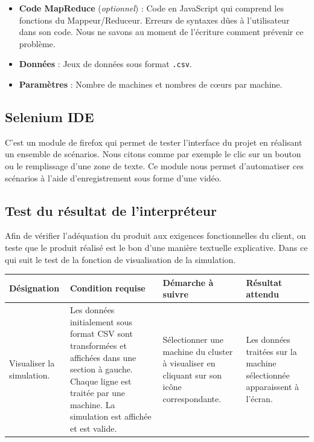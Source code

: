 \vspace{10pt}
\begin{itemize}
\item \textbf{Code MapReduce} (\emph{optionnel}) : Code en JavaScript qui comprend les fonctions du Mappeur/Reduceur. Erreurs de syntaxes dûes à l'utilisateur dans son code. Nous ne savons au moment de l'écriture comment prévenir ce problème.

\item \textbf{Données} : Jeux de données sous format \texttt{.csv}.

\item \textbf{Paramètres} : Nombre de machines et nombres de cœurs par machine.
\end{itemize}

\subsection*{Selenium IDE}
C'est un module de firefox qui permet de tester l'interface du projet en réalisant un ensemble de scénarios. Nous citons comme par exemple le clic sur un bouton ou le remplissage d'une zone de texte. Ce module nous permet d'automatiser ces scénarios à l'aide d'enregistrement sous forme d'une vidéo.

\subsection*{Test du résultat de l'interpréteur} 
Afin de vérifier l'adéquation du produit aux exigences fonctionnelles du client, on teste que le produit réalisé est le bon d'une manière textuelle explicative.
Dans ce qui suit le test de la fonction de visualisation de la simulation.
\vspace{11pt}

\begin{tabularx}{\textwidth}{|X|X|X|X|}
  \hline
  Désignation & Condition requise & Démarche à suivre & Résultat attendu\\
  \hline 
  Visualiser la simulation. & Les données initialement sous format CSV sont transformées et affichées dans une section à gauche. Chaque ligne est traitée par une machine. La simulation est affichée et est valide.& Sélectionner une machine du cluster à visualiser en cliquant sur son icône correspondante. & Les données traitées sur la machine sélectionnée apparaissent à l'écran.\\
  \hline
\end{tabularx}

